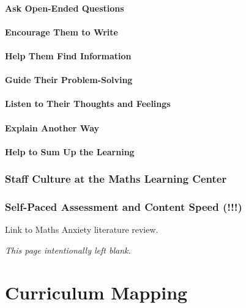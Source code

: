 \documentclass[twoside,12pt,a4paper]{report}
\makeatletter
\newcommand*{\intentionallyblankpage}{
  \vspace*{\fill}
  {\centering \textit{This page intentionally left blank.} \par}
  \vspace{\fill}}
\renewcommand*{\cleardoublepage}{\clearpage\if@twoside \ifodd\c@page\else
  \intentionallyblankpage
  \newpage
  \if@twocolumn\hbox{}\newpage\fi\fi\fi}
\makeatother
\begin{document}
\subsubsection{Ask Open-Ended Questions}

\subsubsection{Encourage Them to Write}

\subsubsection{Help Them Find Information}

\subsubsection{Guide Their Problem-Solving}

\subsubsection{Listen to Their Thoughts and Feelings}

\subsubsection{Explain Another Way}

\subsubsection{Help to Sum Up the Learning}




\subsection{Staff Culture at the Maths Learning Center}

\subsection{Self-Paced Assessment and Content Speed (!!!)}

Link to Maths Anxiety literature review.





\cleardoublepage
\chapter{Curriculum Mapping}
\label{chap:curriculum}
\end{document}
